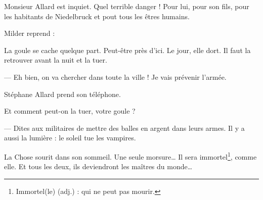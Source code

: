 Monsieur Allard est inquiet. Quel terrible danger ! Pour lui, pour son fils, pour les habitants de Niedelbruck et pout tous les
êtres humains. \fg{}

Milder reprend :

\og La goule se cache quelque part. Peut-être près d'ici. Le jour, elle dort. Il faut la retrouver avant la nuit et la tuer.

--- Eh bien, on va chercher dans toute la ville ! Je vais prévenir l'armée. \fg{}

Stéphane Allard prend son téléphone.

\og Et comment peut-on la tuer, votre goule ?

--- Dites aux militaires de mettre des balles en argent dans leurs armes. Il y a aussi la lumière : le soleil tue les vampires.
\fg{}

La Chose sourit dans son sommeil. Une seule morsure\ldots{} Il sera immortel\footnote{Immortel(le) (adj.) : qui ne peut pas
mourir.}, comme elle. Et tous les deux, ils deviendront les maîtres du monde\ldots{}
